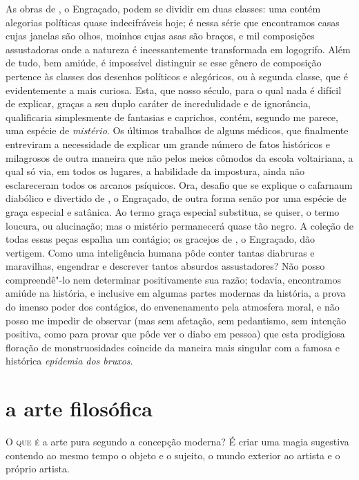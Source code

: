 As obras de , o Engraçado, podem se dividir em duas classes: uma
contém alegorias políticas quase indecifráveis hoje; é nessa série que
encontramos casas cujas janelas são olhos, moinhos cujas asas são
braços, e mil composições assustadoras onde a natureza é
incessantemente transformada em logogrifo. Além de tudo, bem amiúde, é
impossível distinguir se esse gênero de composição pertence às classes
dos desenhos políticos e alegóricos, ou à segunda classe, que é
evidentemente a mais curiosa. Esta, que nosso século, para o qual nada
é difícil de explicar, graças a seu duplo caráter de incredulidade e de
ignorância, qualificaria simplesmente de fantasias e caprichos, contém,
segundo me parece, uma espécie de \textit{mistério}. Os últimos
trabalhos de alguns médicos, que finalmente entreviram a necessidade de
explicar um grande número de fatos históricos e milagrosos de outra
maneira que não pelos meios cômodos da escola voltairiana, a qual só
via, em todos os lugares, a habilidade da impostura, ainda não
esclareceram todos os arcanos psíquicos. Ora, desafio que se explique o
cafarnaum diabólico e divertido de , o Engraçado, de outra
forma senão por uma espécie de graça especial e satânica. Ao termo
graça especial substitua, se quiser, o termo loucura, ou alucinação;
mas o mistério permanecerá quase tão negro. A coleção de todas essas
peças espalha um contágio; os gracejos de , o Engraçado, dão
vertigem. Como uma inteligência humana pôde conter tantas diabruras e
maravilhas, engendrar e descrever tantos absurdos assustadores? Não
posso compreendê"-lo nem determinar positivamente sua razão; todavia,
encontramos amiúde na história, e inclusive em algumas partes modernas
da história, a prova do imenso poder dos contágios, do envenenamento
pela atmosfera moral, e não posso me impedir de observar (mas sem
afetação, sem pedantismo, sem intenção positiva, como para provar que
 pôde ver o diabo em pessoa) que esta prodigiosa floração de
monstruosidades coincide da maneira mais singular com a famosa e
histórica \textit{epidemia dos bruxos}.

\chapter[A arte filosófica]{a arte filosófica}

\noindent\textsc{O que é} a arte pura segundo a concepção moderna? É criar uma magia
sugestiva contendo ao mesmo tempo o objeto e o sujeito, o mundo
exterior ao artista e o próprio artista.

